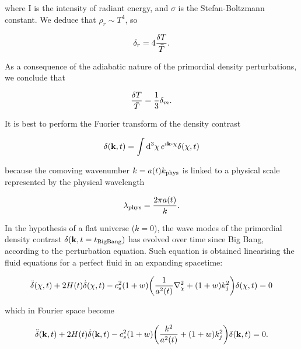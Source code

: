 where I is the intensity of radiant energy, and $\sigma$ is the
Stefan-Boltzmann constant. We deduce that $\rho_r \sim T^4$, so

\begin{equation}
        \delta_r = 4 \frac{\var{T}}{\bar T}.
\end{equation}

As a consequence of the adiabatic nature of the primordial density
perturbations, we conclude that

\begin{equation}
        \frac{\var{T}}{\bar T} = \frac{1}{3} \delta_m.
\end{equation}

It is best to perform the Fuorier transform of the density contrast

\begin{equation}
        \delta \qty(\vb{k},t) = \int \dd[3]{\vb{\chi}} e^{i\vb{k} \vdot
        \vb{\chi}} \delta\qty(\vb{\chi},t)
\end{equation}

because the comoving wavenumber $k = a\qty(t) k_\text{phys}$ is linked to a
physical scale represented by the physical wavelength

\begin{equation}
        \lambda_\text{phys} = \frac{2\pi a\qty(t)}{k}.
\end{equation}

In the hypothesis  of a flat universe ($k = 0$), the wave modes of the
primordial density contrast $\delta\qty(\vb{k},t = t_\text{BigBang})$
has evolved over time since Big Bang, according to the perturbation
equation. Such equation is obtained linearising the fluid equations
for a perfect fluid in an expanding spacetime:

\begin{equation}
        \ddot \delta\qty(\vb{\chi},t) + 2H\qty(t)\dot \delta\qty(\vb{\chi},t) -
        c_s^2\qty(1 + w)\qty(\frac{1}{a^2\qty(t)} \laplacian_\chi + \qty(
        1 + w)k^2_j)
        \delta\qty(\vb{\chi},t) = 0
\end{equation}

which in Fourier space become

\begin{equation}
        \ddot \delta\qty(\vb{k},t) + 2H\qty(t)\dot \delta\qty(\vb{k},t) -
        c_s^2\qty(1 + w)\qty(\frac{k^2}{a^2\qty(t)} + \qty(1 + w)k^2_j)
        \delta\qty(\vb{k},t) = 0.
        \label{eq:perturbations_density}
\end{equation}

